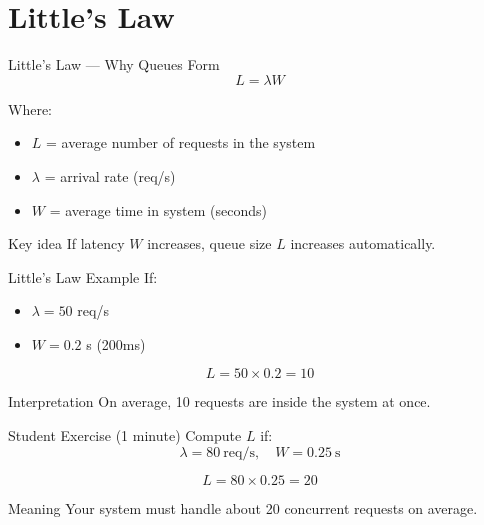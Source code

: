 \documentclass[11pt]{beamer}
\begin{document}
	\section{Little's Law}
	
	\begin{frame}{Little's Law --- Why Queues Form}
		\[
		L = \lambda W
		\]
		

		Where:
		\begin{itemize}
			\item $L$ = average number of requests in the system
			\item $\lambda$ = arrival rate (req/s)
			\item $W$ = average time in system (seconds)
		\end{itemize}
		

		\begin{block}{Key idea}
			If latency $W$ increases, queue size $L$ increases automatically.
		\end{block}
	\end{frame}
	
	\begin{frame}{Little's Law Example}
		If:
		\begin{itemize}
			\item $\lambda = 50$ req/s
			\item $W = 0.2$ s (200ms)
		\end{itemize}
		

		\[
		L = 50 \times 0.2 = 10
		\]

		\begin{alertblock}{Interpretation}
			On average, 10 requests are inside the system at once.
		\end{alertblock}
	\end{frame}
	
	\begin{frame}{Student Exercise (1 minute)}
		Compute $L$ if:
		\[
		\lambda = 80~\text{req/s},\quad W = 0.25~\text{s}
		\]
		

		\[
		L = 80 \times 0.25 = 20
		\]
		

		\begin{block}{Meaning}
			Your system must handle about 20 concurrent requests on average.
		\end{block}
	\end{frame}
	
\end{document}
